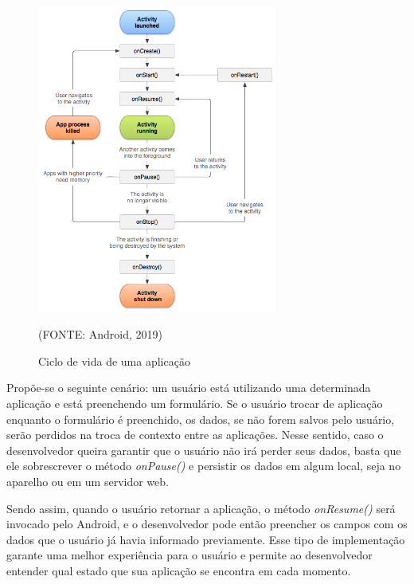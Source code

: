 \documentclass[
    12pt,       %
    openright,      %
    twoside,      %
    a4paper,      %
    english,      %
    french,       %
    spanish,      %
    brazil,       %
    ]{abntex2}
\begin{document}
        \begin{figure}[htbp]
            \begin{center}
                \includegraphics[width=0.7\textwidth]{img/activityLifecycle.png}
            \end{center}
        \caption{\label{fig:passaro} Ciclo de vida de uma aplicação}
        \begin{center}(FONTE: Android, 2019)\end{center}
        \end{figure}

        Propõe-se o seguinte cenário: um usuário está utilizando uma determinada aplicação
        e está preenchendo um formulário. Se o usuário trocar de aplicação enquanto o formulário é
        preenchido, os dados, se não forem salvos pelo usuário, serão perdidos na troca de contexto
        entre as aplicações. Nesse sentido, caso o desenvolvedor queira garantir que o usuário não
        irá perder seus dados, basta que ele sobrescrever o método \textit{onPause()} e persistir
        os dados em algum local, seja no aparelho ou em um servidor web.

        Sendo assim, quando o usuário retornar a aplicação, o método \textit{onResume()} será invocado
        pelo Android, e o desenvolvedor pode então preencher os campos com os dados que o usuário
        já havia informado previamente. Esse tipo de implementação garante uma melhor experiência para
        o usuário e permite ao desenvolvedor entender qual estado que sua aplicação se encontra em cada
        momento.
\end{document}
